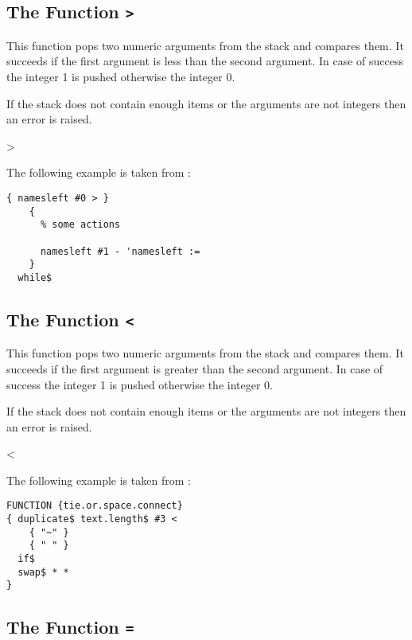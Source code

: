 \subsection{The Function \texttt{>}}%
\fctIndex{>}

This function pops two numeric arguments from the stack and
compares them. It succeeds if the first argument is less than the
second argument. In case of success the integer 1 is pushed otherwise
the integer 0.

If the stack does not contain enough items or the arguments are not
integers then an error is raised.

\begin{BstFunction}{>}
\end{BstFunction}

The following example is taken from :

\begin{lstlisting}[language=bst]
    { namesleft #0 > }
    { 
      % some actions

      namesleft #1 - 'namesleft :=
    }
  while$
\end{lstlisting}


\subsection{The Function \texttt{<}}%
\fctIndex{<}

This function pops two numeric arguments from the stack and
compares them. It succeeds if the first argument is greater than the
second argument. In case of success the integer 1 is pushed otherwise
the integer 0.

If the stack does not contain enough items or the arguments are not
integers then an error is raised.

\begin{BstFunction}{<}
\end{BstFunction}

The following example is taken from :

\begin{lstlisting}[language=bst]
FUNCTION {tie.or.space.connect}
{ duplicate$ text.length$ #3 <
    { "~" }
    { " " }
  if$
  swap$ * *
}
\end{lstlisting}\fctIndex{<}\fctIndex{*}%


\subsection{The Function \texttt{=}}%
\fctIndex{=}

